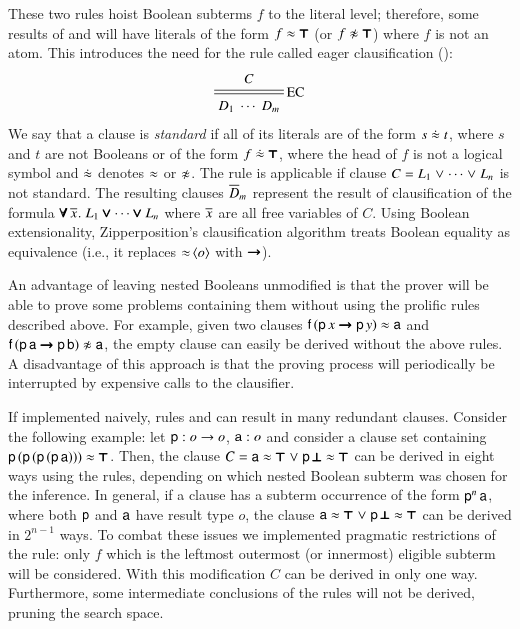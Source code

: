\newcommand{\eqneq}{\mathrel{\dot{\eq}}}
These two rules hoist Boolean subterms $f$ to the literal level; therefore,
some results of  and  will have literals of the form $f \approx \pmb\top$ (or
$f \noteq \itrue$) where $f$ is not an atom. This introduces the need for the rule
called eager clausification ():
%
$$ \namedsimp{EC}{C}{D_1 \; \cdots \; D_m} $$
%
We say that a clause is \emph{standard} if all of its literals are of the form $s \eqneq t$,
where $s$ and $t$ are not Booleans or of the form $f \eqneq \itrue$, where the head of $f$
is not a logical symbol and $\eqneq$ denotes $\approx$ or $\not\approx$. The rule 
is applicable if clause $C = L_1 \mathrel\lor
\cdots \mathrel\lor L_n$ is not standard.
The resulting clauses $\overline{D}_{m}$ represent
the result of clausification of the formula $\pmb\forall\,\overline{x}_{}. \; L_1 \pmb\lor
\cdots \pmb\lor L_n$ where $\overline{x}_{}$ are all free variables of $C$.
Using Boolean extensionality, Zipperposition's clausification
algorithm treats Boolean equality as equivalence (i.e., it replaces
$\mathop{\approx}{\langle o\rangle}$ with $\pmb\rightarrow$).

An advantage of leaving nested Booleans unmodified is that the prover will be able
to prove some problems containing them without using the prolific rules described
above. For example, given two clauses $\mathsf{f} \, (\mathsf{p} \, x
\pmb\rightarrow \mathsf{p} \, y) \approx \mathsf{a}$ and $\cst{f} \, (\cst{p} \,
\cst{a} \iimplies \cst{p} \, \cst{b}) \noteq \cst{a}$, the empty clause can
easily be derived without the above rules. A disadvantage of this approach
is that the proving process will periodically be interrupted by expensive calls
to the clausifier.
\pagebreak[2]

If implemented naively, rules  and  can result in many redundant clauses. Consider the following
example: let $\mathsf{p} : o \rightarrow o$, $\mathsf{a} : o$ and consider a clause
set containing $\mathsf{p} \, (\mathsf{p} \, (\mathsf{p} \, (\mathsf{p} \, \mathsf{a}))) \approx
\pmb\top$. Then, the clause $C = \mathsf{a} \approx \pmb\top \mathrel\lor \mathsf{p} \, \pmb\bot \approx \pmb\top$ can be
derived in eight ways using the rules, depending on which nested Boolean subterm was
chosen for the inference. In general, if a clause has a subterm occurrence of the form $\mathsf{p}^n \, \mathsf{a}$,
where both $\mathsf{p}$ and $\mathsf{a}$ have result type $o$, the clause $\mathsf{a} \approx \pmb\top \mathrel\lor \mathsf{p} \, \pmb\bot \approx \pmb\top$ can be derived in $2^{n-1}$ ways.
To combat these issues we
implemented pragmatic restrictions of the rule: only $f$ which is
the leftmost outermost (or innermost) eligible subterm will be considered. With
this modification $C$ can be derived in only one way. Furthermore,
some intermediate conclusions of the rules will not be derived, pruning the search space.

